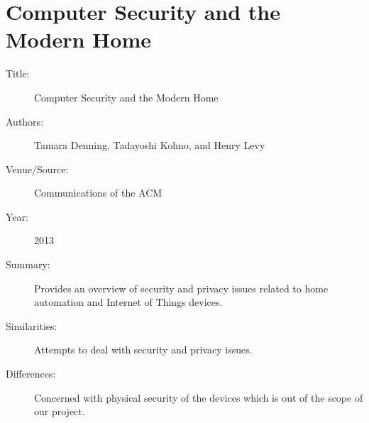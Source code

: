 \documentclass[letterpaper,12pt]{article}
\begin{document}
\section{Computer Security and the Modern Home~\cite{modernHome}}
\begin{description}
 \item[Title:] Computer Security and the Modern Home
 \item[Authors:] Tamara Denning, Tadayoshi Kohno, and Henry Levy
 \item[Venue/Source:] Communications of the ACM
 \item[Year:] 2013
 \item[Summary:] Provides an overview of security and privacy issues related to home automation and Internet of Things devices.
 \item[Similarities:] Attempts to deal with security and privacy issues.
 \item[Differences:] Concerned with physical security of the devices which is out of the scope of our project.
\end{description}



\end{document}
